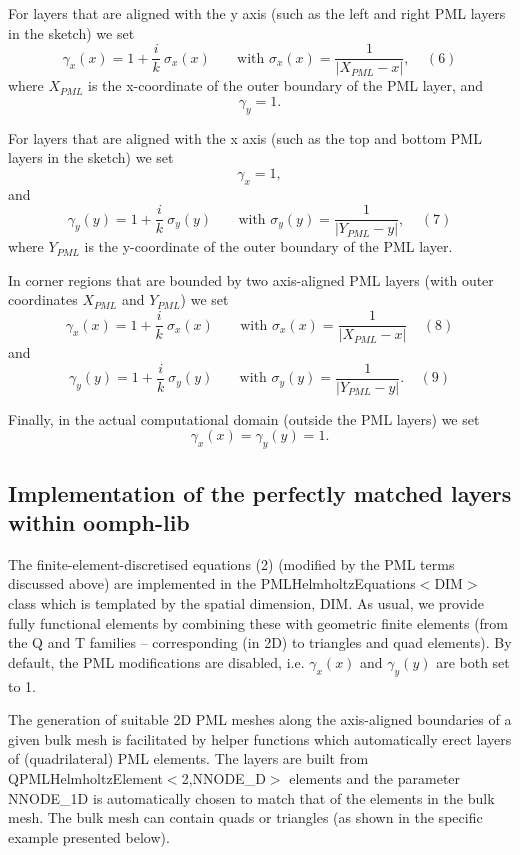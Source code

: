 \begin{DoxyItemize}
\item For layers that are aligned with the y axis (such as the left and right P\+ML layers in the sketch) we set \[ \gamma_{x}(x) = 1 +\frac{i}{k}\ \sigma_{x}(x) \ \ \ \ \ \ \ \mbox{ \ \ \ with \ \ \ } \sigma_{x}(x) = \frac{1}{|X_{PML}-x|}, \ \ \ \ \ (6) \] where $ X_{PML} $ is the x-\/coordinate of the outer boundary of the P\+ML layer, and \[ \gamma_y = 1. \]
\item For layers that are aligned with the x axis (such as the top and bottom P\+ML layers in the sketch) we set \[ \gamma_x = 1, \] and \[ \gamma_{y}(y) = 1+\frac{i}{k} \ \sigma_{y}(y) \ \ \ \ \ \ \ \mbox{ \ \ \ with \ \ \ } \sigma_{y}(y) = \frac{1}{|Y_{PML}-y|}, \ \ \ \ \ (7) \] where $ Y_{PML} $ is the y-\/coordinate of the outer boundary of the P\+ML layer.
\item In corner regions that are bounded by two axis-\/aligned P\+ML layers (with outer coordinates $ X_{PML} $ and $ Y_{PML} $) we set \[ \gamma_{x}(x) = 1 +\frac{i}{k}\ \sigma_{x}(x) \ \ \ \ \ \ \ \mbox{ \ \ \ with \ \ \ } \sigma_{x}(x) = \frac{1}{|X_{PML}-x|} \ \ \ \ \ (8) \] and \[ \gamma_{y}(y) = 1+\frac{i}{k} \ \sigma_{y}(y) \ \ \ \ \ \ \ \mbox{ \ \ \ with \ \ \ } \sigma_{y}(y) = \frac{1}{|Y_{PML}-y|}. \ \ \ \ \ (9) \]
\item Finally, in the actual computational domain (outside the P\+ML layers) we set \[ \gamma_{x}(x) = \gamma_{y}(y) = 1. \]
\end{DoxyItemize}\hypertarget{index_impl}{}\subsection{Implementation of the perfectly matched layers within oomph-\/lib}\label{index_impl}
The finite-\/element-\/discretised equations (2) (modified by the P\+ML terms discussed above) are implemented in the {\ttfamily P\+M\+L\+Helmholtz\+Equations$<$\+D\+I\+M$>$} class which is templated by the spatial dimension, {\ttfamily D\+IM}. As usual, we provide fully functional elements by combining these with geometric finite elements (from the Q and T families -- corresponding (in 2D) to triangles and quad elements). By default, the P\+ML modifications are disabled, i.\+e. $ \gamma_{x}(x) $ and $ \gamma_{y}(y) $ are both set to 1.

The generation of suitable 2D P\+ML meshes along the axis-\/aligned boundaries of a given bulk mesh is facilitated by helper functions which automatically erect layers of (quadrilateral) P\+ML elements. The layers are built from {\ttfamily Q\+P\+M\+L\+Helmholtz\+Element$<$2,\+N\+N\+O\+D\+E\+\_\+D$>$} elements and the parameter {\ttfamily N\+N\+O\+D\+E\+\_\+1D} is automatically chosen to match that of the elements in the bulk mesh. The bulk mesh can contain quads or triangles (as shown in the specific example presented below).

